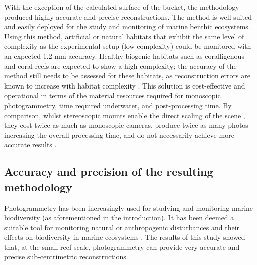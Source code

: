 With the exception of the calculated surface of the bucket, the methodology produced highly accurate and precise reconstructions. The method is well-suited and easily deployed for the study and monitoring of marine benthic ecosystems. Using this method, artificial or natural habitats that exhibit the same level of complexity as the experimental setup (low complexity) could be monitored with an expected 1.2 mm accuracy. Healthy biogenic habitats such as coralligenous and coral reefs are expected to show a high complexity; the accuracy of the method still needs to be assessed for these habitats, as reconstruction errors are known to increase with habitat complexity \citep{bryson_characterization_2017, figueira_accuracy_2015}. This solution is cost-effective and operational in terms of the material resources required for monoscopic photogrammetry, time required underwater, and post-processing time. By comparison, whilst stereoscopic mounts enable the direct scaling of the scene \citep{ahmadabadian_comparison_2013}, they cost twice as much as monoscopic cameras, produce twice as many photos increasing the overall processing time, and do not necessarily achieve more accurate results \citep{figueira_accuracy_2015, abdo_efficiently_2006, bryson_characterization_2017}.

\subsection{Accuracy and precision of the resulting methodology}\label{chapitre1_4.3}
Photogrammetry has been increasingly used for studying and monitoring marine biodiversity (as aforementioned in the introduction). It has been deemed a suitable tool for monitoring natural or anthropogenic disturbances and their effects on biodiversity in marine ecosystems \citep{burns_assessing_2016}. The results of this study showed that, at the small reef scale, photogrammetry can provide very accurate and precise sub-centrimetric reconstructions. 

